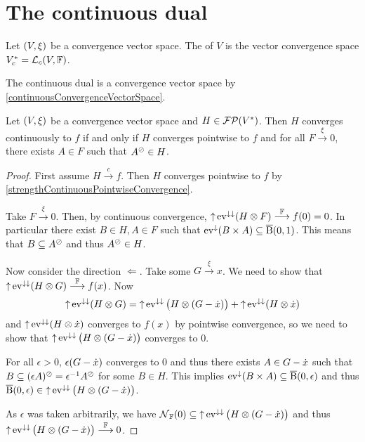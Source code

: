 \section{The continuous dual}
\begin{definition}
Let $\sSet{V,\xi}$ be a convergence vector space. The  of $V$ is the vector convergence space ${V}^*_c = \operatorname{\mathcal{L}}_c(V, \mathbb{F})$.
\end{definition}
The continuous dual is a convergence vector space by \ref{continuousConvergenceVectorSpace}.

\begin{proposition}
Let $\sSet{V,\xi}$ be a convergence vector space and $H\in \operatorname{\mathcal{FP}}({V}^*)$. Then $H$ converges continuously to $f$ \textup{if and only if} $H$ converges pointwise to $f$ and for all $F \overset{\xi}{\longrightarrow} 0$, there exists $A\in F$ such that $A^\oslash\in H$.
\end{proposition}
\begin{proof}
First assume $H\overset{c}{\longrightarrow} f$. Then $H$ converges pointwise to $f$ by \ref{strengthContinuousPointwiseConvergence}.

Take $F \overset{\xi}{\longrightarrow} 0$. Then, by continuous convergence, $\operatorname{\uparrow}\operatorname{ev}^{\downarrow\downarrow}(H\otimes F) \overset{\mathbb{F}}{\longrightarrow} f(0) = 0$. In particular there exist $B\in H, A\in F$ such that $\operatorname{ev}^\downarrow(B\times A) \subseteq \operatorname{\overline{B}}(0,1)$. This means that $B\subseteq A^\oslash$ and thus $A^\oslash\in H$.

Now consider the direction $\Leftarrow$. Take some $G\overset{\xi}{\longrightarrow} x$. We need to show that $\operatorname{\uparrow}\operatorname{ev}^{\downarrow\downarrow}(H\otimes G) \overset{\mathbb{F}}{\longrightarrow} f(x)$. Now
\[ \operatorname{\uparrow}\operatorname{ev}^{\downarrow\downarrow}(H\otimes G) = \operatorname{\uparrow}\operatorname{ev}^{\downarrow\downarrow}\big(H\otimes (G-\dot{x})\big) + \operatorname{\uparrow}\operatorname{ev}^{\downarrow\downarrow}(H\otimes \dot{x}) \]
and $\operatorname{\uparrow}\operatorname{ev}^{\downarrow\downarrow}(H\otimes \dot{x})$ converges to $f(x)$ by pointwise convergence, so we need to show that $\operatorname{\uparrow}\operatorname{ev}^{\downarrow\downarrow}\big(H\otimes (G-\dot{x})\big)$ converges to $0$.

For all $\epsilon > 0$, $\epsilon(G-\dot{x})$ converges to $0$ and thus there exists $A\in G-\dot{x}$ such that $B\subseteq (\epsilon A)^\oslash = \epsilon^{-1}A^\oslash$ for some $B\in H$. This implies $\operatorname{ev}^{\downarrow}(B\times A) \subseteq \operatorname{\overline{B}}(0,\epsilon)$ and thus $\operatorname{\overline{B}}(0,\epsilon)\in \operatorname{\uparrow}\operatorname{ev}^{\downarrow\downarrow}\big(H\otimes (G-\dot{x})\big)$.

As $\epsilon$ was taken arbitrarily, we have $\operatorname{\mathcal{N}}_{\mathbb{F}}(0) \subseteq \operatorname{\uparrow}\operatorname{ev}^{\downarrow\downarrow}\big(H\otimes (G-\dot{x})\big)$ and thus $\operatorname{\uparrow}\operatorname{ev}^{\downarrow\downarrow}\big(H\otimes (G-\dot{x})\big) \overset{\mathbb{F}}{\longrightarrow} 0$.
\end{proof}
